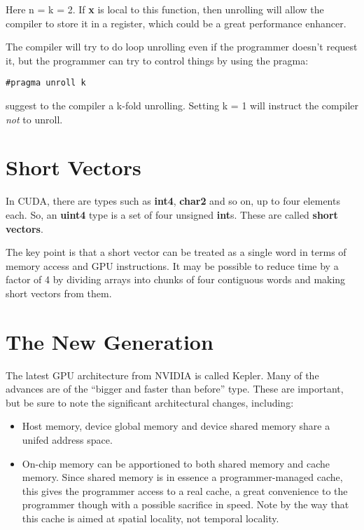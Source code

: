 Here n = k = 2.  If {\bf x} is local to this function, then unrolling
will allow the compiler to store it in a register, which could be a
great performance enhancer.

The compiler will try to do loop unrolling even if the programmer
doesn't request it, but the programmer can try to control things by
using the pragma:

\begin{Verbatim}[fontsize=\relsize{-2}]
#pragma unroll k
\end{Verbatim}

suggest to the compiler a k-fold unrolling.  Setting k = 1 will instruct
the compiler {\it not} to unroll.

\section{Short Vectors}

In CUDA, there are types such as {\bf int4}, {\bf char2} and so on, up
to four elements each.  So, an {\bf uint4} type is a set of four unsigned
{\bf int}s.  These are called {\bf short vectors}.

The key point is that a short vector can be treated as a single word in
terms of memory access and GPU instructions.  It may be possible to
reduce time by a factor of 4 by dividing arrays into chunks of four
contiguous words and making short vectors from them.

\section{The New Generation}

The latest GPU architecture from NVIDIA is called Kepler.  Many of the
advances are of the ``bigger and faster than before'' type.  These are
important, but be sure to note the significant architectural changes,
including:

\begin{itemize}

\item Host memory, device global memory and device shared memory share a
unifed address space.

\item On-chip memory can be apportioned to both shared memory and cache
memory.  Since shared memory is in essence a programmer-managed cache,
this gives the programmer access to a real cache, a great convenience to
the programmer though with a possible sacrifice in speed.  Note by the
way that this cache is aimed at spatial locality, not temporal
locality.

\end{itemize}

